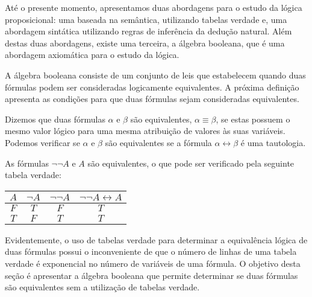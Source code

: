 Até o presente momento, apresentamos duas abordagens para o estudo da
lógica proposicional: uma baseada na semântica, utilizando tabelas
verdade e, uma abordagem sintática utilizando regras de inferência da
dedução natural. Além destas duas abordagens, existe uma terceira,
a álgebra booleana, que é uma abordagem axiomática para o estudo da
lógica.

A álgebra booleana consiste de um conjunto de leis que estabelecem
quando duas fórmulas podem ser consideradas
logicamente equivalentes. A próxima definição apresenta as condições
para que duas fórmulas sejam consideradas equivalentes.

\begin{Definition}
Dizemos que duas
fórmulas $\alpha$ e $\beta$ são equivalentes, $\alpha \equiv \beta$, se estas possuem o mesmo valor lógico para
uma mesma atribuição de valores às suas variáveis. Podemos verificar
se $\alpha$ e $\beta$ são equivalentes se a
fórmula $\alpha\leftrightarrow\beta$ é uma tautologia.
\end{Definition}

\begin{Example}
As fórmulas $\neg \neg A$ e $A$ são equivalentes,
o que pode ser verificado pela seguinte tabela verdade:
\begin{table}[h]
  \begin{tabular}{|c|c|c|c|} \hline
      $A$ & $\neg A$ & $\neg \neg A$ & $\neg\neg A\leftrightarrow A$
      \\ \hline
      $F$ & $T$ & $F$ & $T$\\
      $T$ & $F$ & $T$ & $T$ \\ \hline
   \end{tabular}
   \centering
\end{table}
\end{Example}
Evidentemente, o uso de tabelas verdade para determinar a equivalência
lógica de duas fórmulas possui o inconveniente de que o número de
linhas de uma tabela verdade é exponencial no número de variáveis de
uma fórmula. O objetivo desta seção é apresentar a álgebra booleana
que permite determinar se duas fórmulas são equivalentes sem a
utilização de tabelas verdade.

